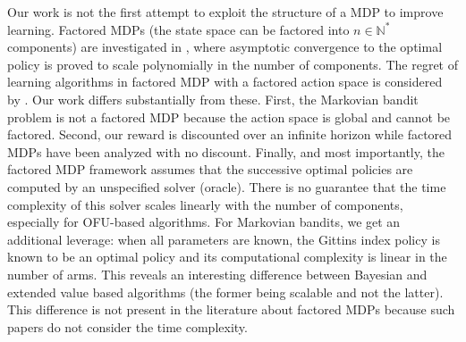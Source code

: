 Our work is not the first attempt to exploit the structure of a MDP to improve
learning.  Factored MDPs (the state space can be
factored into $n\in\mathbb{N}^*$ components) are investigated in
\cite{guestrin2003efficient}, where asymptotic convergence to
the optimal policy is proved to scale polynomially in the number of components.
The regret of learning algorithms in factored MDP with a factored action space
is considered by 
\cite{tian2020towards,rosenberg2020oracle,xu2020reinforcement,osband2014near}. Our work differs substantially from these. 
First,  the Markovian bandit problem   is not a  factored MDP because  the action
space is global and  cannot be factored. 
Second, our reward is discounted over an infinite horizon while  factored MDPs have been analyzed with no discount.
Finally, and most importantly, the factored MDP framework assumes that the successive optimal policies are  computed by an unspecified solver (oracle). There is no guarantee that the time complexity of this solver scales linearly with the number of components, especially for OFU-based
algorithms.
For Markovian bandits, we get an  additional leverage: when all parameters are known, the Gittins index policy is known to be an optimal policy and its computational complexity is linear in the number of arms. This reveals an interesting difference between Bayesian and extended value based algorithms (the former being scalable and not the latter). This difference is not present in the literature about factored MDPs because such papers do not consider the time complexity.

